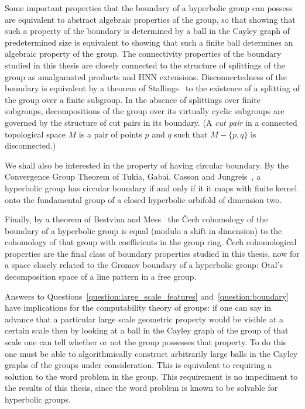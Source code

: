 Some important properties that the boundary of a hyperbolic group can possess are equivalent to abstract algebraic properties of the group, so that showing that such a  property of the boundary is determined by a ball in the Cayley graph of predetermined size is equivalent to showing that such a finite ball determines an algebraic property of the group.
The connectivity properties of the boundary studied in this thesis are closely connected to the structure of splittings of the group as amalgamated products and HNN extensions.
Disconnectedness of the boundary is equivalent by a theorem of Stallings~\cite{stallings68,stallings71} to the existence of a splitting of the group over a finite subgroup.
In the absence of splittings over finite subgroups, decompositions of the group over its virtually cyclic subgroups are governed by the structure of cut pairs in its boundary.
(A \emph{cut pair} in a connected topological space $M$ is a pair of points $p$ and $q$ such that $M - \{p, q\}$ is disconnected.)

We shall also be interested in the property of having circular boundary.
By the Convergence Group Theorem of Tukia, Gabai, Casson and Jungreis~\cite{tukia88,gabai92,cassonjungreis94}, a hyperbolic group has circular boundary if and only if it it maps with finite kernel onto the fundamental group of a closed hyperbolic orbifold of dimension two.

Finally, by a theorem of Bestvina and Mess~\cite{bestvinamess91} the \v{C}ech cohomology of the boundary of a hyperbolic group is equal (modulo a shift in dimension) to the cohomology of that group with coefficients in the group ring.
\v{C}ech cohomological properties are the final class of boundary properties studied in this thesis, now for a space closely related to the Gromov boundary of a hyperbolic group: Otal's decomposition space of a line pattern in a free group.

Answers to Questions~\ref{question:large_scale_features} and~\ref{question:boundary} have implications for the computability theory of groups: if one can say in advance that a particular large scale geometric property would be visible at a certain scale then by looking at a ball in the Cayley graph of the group of that scale one can tell whether or not the group possesses that property.
To do this one must be able to algorithmically construct arbitrarily large balls in the Cayley graphs of the groups under consideration.
This is equivalent to requiring a solution to the word problem in the group.
This requirement is no impediment to the results of this thesis, since the word problem is known to be solvable for hyperbolic groups.

